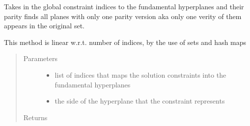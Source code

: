 \documentclass[letterpaper,10pt,english]{sphinxmanual}
\begin{document}
\begin{fulllineitems}
\label{\detokenize{mpo.upop:mpo.upop.upop_utils.get_outer_boundaries}}
\sphinxAtStartPar
Takes in the global constraint indices to the fundamental hyperplanes and their parity finds all planes with only one parity version aka only one verity of them appears in the original set.

\sphinxAtStartPar
This method is linear w.r.t. number of indices, by the use of sets and hash maps
\begin{quote}\begin{description}
\item[{Parameters}] \leavevmode\begin{itemize}
\item {} 
\sphinxAtStartPar
{} \textendash{} list of indices that maps the solution constraints into the fundamental hyperplanes

\item {} 
\sphinxAtStartPar
{} \textendash{} the side of the hyperplane that the constraint represents

\end{itemize}

\item[{Returns}] \leavevmode
\sphinxAtStartPar


\end{description}\end{quote}

\end{fulllineitems}

\end{document}
